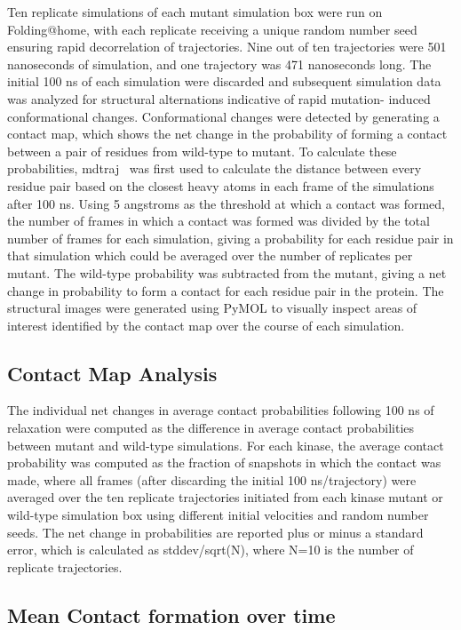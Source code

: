 \documentclass[phd,tocprelim]{cornell}
\begin{document}
Ten replicate simulations of each mutant simulation box were run on Folding@home, with each replicate receiving a unique random number seed ensuring rapid decorrelation of trajectories. Nine out of ten trajectories were 501 nanoseconds of simulation, and one trajectory was 471 nanoseconds long. The initial 100 ns of each simulation were discarded and subsequent simulation data was analyzed for structural alternations indicative of rapid mutation- induced conformational changes.
Conformational changes were detected by generating a contact map, which shows the net change in the probability of forming a contact between a pair of residues from wild-type to mutant. To calculate these probabilities, mdtraj~\citep{McGibbon:2015fv} was first used to calculate the distance between every residue pair based on the closest heavy atoms in each frame of the simulations after 100 ns. Using 5 angstroms as the threshold at which a contact was formed, the number of frames in which a contact was formed was divided by the total number of frames for each simulation, giving a probability for each residue pair in that simulation which could be averaged over the number of replicates per mutant. The wild-type probability was subtracted from the mutant, giving a net change in probability to form a contact for each residue pair in the protein. The structural images were generated using PyMOL to visually inspect areas of interest identified by the contact map over the course of each simulation.

\subsection{Contact Map Analysis}
The individual net changes in average contact probabilities following 100 ns of relaxation were computed as the difference in average contact probabilities between mutant and wild-type simulations. For each kinase, the average contact probability was computed as the fraction of snapshots in which the contact was made, where all frames (after discarding the initial 100 ns/trajectory) were averaged over the ten replicate trajectories initiated from each kinase mutant or wild-type simulation box using different initial velocities and random number seeds. The net change in probabilities are reported plus or minus a standard error, which is calculated as stddev/sqrt(N), where N=10 is the number of replicate trajectories.

\subsection{Mean Contact formation over time}
\end{document}
